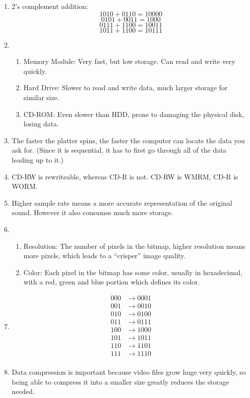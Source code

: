 \documentclass[hidelinks,12pt]{article}
\begin{document}
\begin{enumerate}
\begin{enumerate}
    \end{enumerate}
\item 2's complement addition:
    \[1010+0110=10000\tag{Underflow}\]
    \[0101+0011=1000\tag{Overflow}\]
    \[0111+1100=10011\tag{Underflow}\]
    \[1011+1100=10111\]
\item \begin{enumerate}
    \item Memory Module: Very fast, but low storage. Can read and write very quickly.
    \item Hard Drive: Slower to read and write data, much larger storage for similar size.
    \item CD-ROM: Even slower than HDD, prone to damaging the physical disk, losing data.
\end{enumerate}
\item The faster the platter spins, the faster the computer can locate the data you ask for. (Since it is sequential, it has to first go through all of the data leading up to it.)
\item CD-RW is rewriteable, whereas CD-R is not. CD-RW is WMRM, CD-R is WORM.
\item Higher sample rate means a more accurate representation of the original sound. However it also consumes much more storage. 
\item \begin{enumerate}
    \item Resolution: The number of pixels in the bitmap, higher resolution means more pixels, which leads to a ``crisper'' image quality.
    \item Color: Each pixel in the bitmap has some color, usually in hexadecimal, with a red, green and blue portion which defines its color.
\end{enumerate}
\item \begin{align*}
        000 &\to 0001\\
        001 &\to 0010\\
        010 &\to 0100\\
        011 &\to 0111\\
        100 &\to 1000\\
        101 &\to 1011\\
        110 &\to 1101\\
        111 &\to 1110\\
\end{align*}
    \item Data compression is important because video files grow huge very quickly, so being able to compress it into a smaller size greatly reduces the storage needed.
\end{enumerate}
\end{document}

